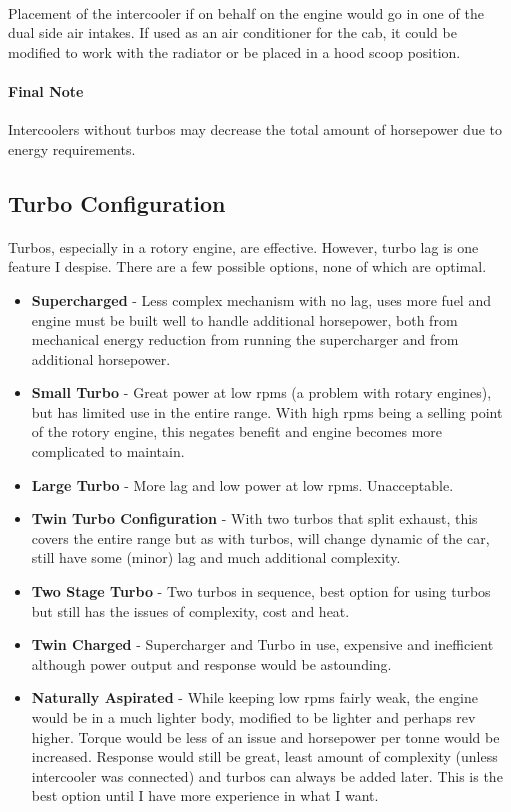 \documentclass[a4paper,10pt]{report}
\begin{document}
\paragraph*{}Placement of the intercooler if on behalf on the engine would go in one of the dual side air intakes. If used as an air conditioner for the cab, it could be modified to work with the radiator or be placed in a hood scoop position.
\paragraph*{Final Note} Intercoolers without turbos may decrease the total amount of horsepower due to energy requirements.
\subsection{Turbo Configuration} 
\paragraph*{}Turbos, especially in a rotory engine, are effective. However, turbo lag is one feature I despise. There are a few possible options, none of which are optimal. 
\begin{itemize}
 \item \textbf{Supercharged} - Less complex mechanism with no lag, uses more fuel and engine must be built well to handle additional horsepower, both from mechanical energy reduction from running the supercharger and from additional horsepower.
 \item \textbf{Small Turbo} - Great power at low rpms (a problem with rotary engines), but has limited use in the entire range. With high rpms being a selling point of the rotory engine, this negates benefit and engine becomes more complicated to maintain.
 \item \textbf{Large Turbo} - More lag and low power at low rpms. Unacceptable.
 \item \textbf{Twin Turbo Configuration} - With two turbos that split exhaust, this covers the entire range but as with turbos, will change dynamic of the car, still have some (minor) lag and much additional complexity.
 \item \textbf{Two Stage Turbo} - Two turbos in sequence, best option for using turbos but still has the issues of complexity, cost and heat.
 \item \textbf{Twin Charged} - Supercharger and Turbo in use, expensive and inefficient although power output and response would be astounding.
 \item \textbf{Naturally Aspirated} - While keeping low rpms fairly weak, the engine would be in a much lighter body, modified to be lighter and perhaps rev higher. Torque would be less of an issue and horsepower per tonne would be increased. Response would still be great, least amount of complexity (unless intercooler was connected) and turbos can always be added later. This is the best option until I have more experience in what I want.
\end{itemize}
\end{document}
